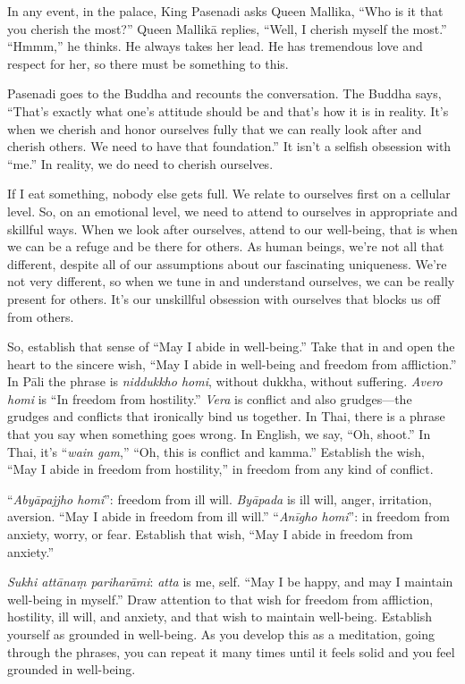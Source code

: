 In any event, in the palace, King Pasenadi asks Queen Mallika, “Who is
it that you cherish the most?” Queen Mallikā replies, “Well, I cherish
myself the most.” “Hmmm,” he thinks. He always takes her lead. He has
tremendous love and respect for her, so there must be something to this.

Pasenadi goes to the Buddha and recounts the conversation. The Buddha
says, “That’s exactly what one’s attitude should be and that’s how it is
in reality. It’s when we cherish and honor ourselves fully that we can
really look after and cherish others. We need to have that foundation.”
It isn’t a selfish obsession with “me.” In reality, we do need to
cherish ourselves.

If I eat something, nobody else gets full. We relate to ourselves first
on a cellular level. So, on an emotional level, we need to attend to
ourselves in appropriate and skillful ways. When we look after
ourselves, attend to our well-being, that is when we can be a refuge and
be there for others. As human beings, we’re not all that different,
despite all of our assumptions about our fascinating uniqueness. We’re
not very different, so when we tune in and understand ourselves, we can
be really present for others. It’s our unskillful obsession with
ourselves that blocks us off from others.

So, establish that sense of “May I abide in well-being.” Take that in
and open the heart to the sincere wish, “May I abide in well-being and
freedom from affliction.” In Pāli the phrase is \emph{niddukkho homi},
without dukkha, without suffering. \emph{Avero homi} is “In freedom from
hostility.” \emph{Vera} is conflict and also grudges—the grudges and
conflicts that ironically bind us together. In Thai, there is a phrase
that you say when something goes wrong. In English, we say, “Oh, shoot.”
In Thai, it’s “\emph{wain gam},” “Oh, this is conflict and kamma.”
Establish the wish, “May I abide in freedom from hostility,” in freedom
from any kind of conflict.

“\emph{Abyāpajjho homi}”: freedom from ill will. \emph{Byāpada} is ill
will, anger, irritation, aversion. “May I abide in freedom from ill
will.” “\emph{Anīgho homi}”: in freedom from anxiety, worry, or fear.
Establish that wish, “May I abide in freedom from anxiety.”

\emph{Sukhi attānaṃ pariharāmi}: \emph{atta} is me, self. “May I be
happy, and may I maintain well-being in myself.” Draw attention to that
wish for freedom from affliction, hostility, ill will, and anxiety, and
that wish to maintain well-being. Establish yourself as grounded in
well-being. As you develop this as a meditation, going through the
phrases, you can repeat it many times until it feels solid and you feel
grounded in well-being.

